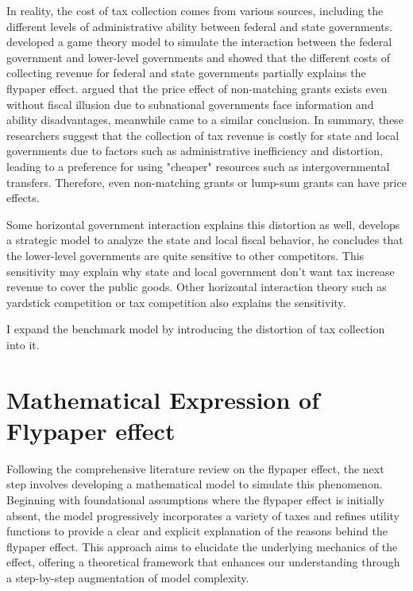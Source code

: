 In reality, the cost of tax collection comes from various sources, including the different levels of administrative ability between federal and state governments. \textcite{volden2007intergovernmental} developed a game theory model to simulate the interaction between the federal government and lower-level governments and showed that the different costs of collecting revenue for federal and state governments partially explains the flypaper effect. \textcite{dahlby2016stimulative} argued that the price effect of non-matching grants exists even without fiscal illusion due to subnational governments face information and ability disadvantages, meanwhile \textcite{vegh2016unsticking} came to a similar conclusion. In summary, these researchers suggest that the collection of tax revenue is costly for state and local governments due to factors such as administrative inefficiency and distortion, leading to a preference for using "cheaper" resources such as intergovernmental transfers. Therefore, even non-matching grants or lump-sum grants can have price effects.

Some horizontal government interaction explains this distortion as well, \textcite{brueckner2003strategic} develops a strategic model to analyze the state and local fiscal behavior, he concludes that the lower-level governments are quite sensitive to other competitors. This sensitivity may explain why state and local government don't want tax increase revenue to cover the public goods. Other horizontal interaction theory such as yardstick competition or tax competition also explains the sensitivity.



I expand the benchmark model by introducing the distortion of tax collection into it.


\section{Mathematical Expression of Flypaper effect}

Following the comprehensive literature review on the flypaper effect, the next step involves developing a mathematical model to simulate this phenomenon. Beginning with foundational assumptions where the flypaper effect is initially absent, the model progressively incorporates a variety of taxes and refines utility functions to provide a clear and explicit explanation of the reasons behind the flypaper effect. This approach aims to elucidate the underlying mechanics of the effect, offering a theoretical framework that enhances our understanding through a step-by-step augmentation of model complexity.


